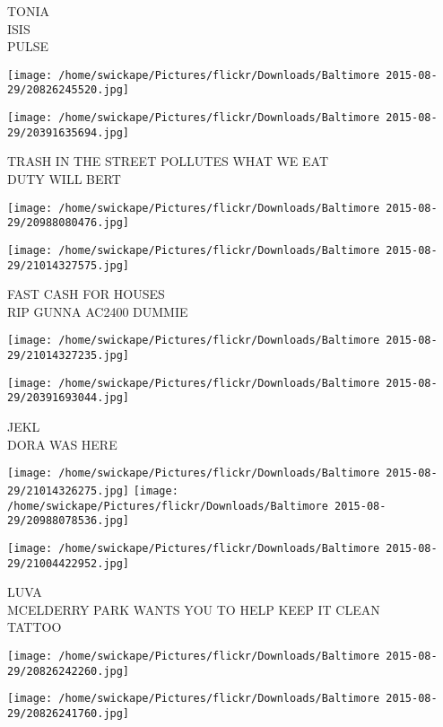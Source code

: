 \documentclass[10pt,letterpaper]{article}
\begin{document}
TONIA\\
ISIS\\
PULSE
\pagebreak

\texttt{[image: /home/swickape/Pictures/flickr/Downloads/Baltimore 2015-08-29/20826245520.jpg]}

\vspace{0.25in}
\texttt{[image: /home/swickape/Pictures/flickr/Downloads/Baltimore 2015-08-29/20391635694.jpg]}

TRASH IN THE STREET POLLUTES WHAT WE EAT\\
DUTY WILL BERT
\pagebreak

\texttt{[image: /home/swickape/Pictures/flickr/Downloads/Baltimore 2015-08-29/20988080476.jpg]}

\vspace{0.25in}
\texttt{[image: /home/swickape/Pictures/flickr/Downloads/Baltimore 2015-08-29/21014327575.jpg]}

FAST CASH FOR HOUSES\\
RIP GUNNA AC2400 DUMMIE
\pagebreak

\texttt{[image: /home/swickape/Pictures/flickr/Downloads/Baltimore 2015-08-29/21014327235.jpg]}

\vspace{0.25in}
\texttt{[image: /home/swickape/Pictures/flickr/Downloads/Baltimore 2015-08-29/20391693044.jpg]}

JEKL\\
DORA WAS HERE
\pagebreak

\texttt{[image: /home/swickape/Pictures/flickr/Downloads/Baltimore 2015-08-29/21014326275.jpg]}
\texttt{[image: /home/swickape/Pictures/flickr/Downloads/Baltimore 2015-08-29/20988078536.jpg]}

\texttt{[image: /home/swickape/Pictures/flickr/Downloads/Baltimore 2015-08-29/21004422952.jpg]}

LUVA\\
MCELDERRY PARK WANTS YOU TO HELP KEEP IT CLEAN\\
TATTOO
\pagebreak

\texttt{[image: /home/swickape/Pictures/flickr/Downloads/Baltimore 2015-08-29/20826242260.jpg]}

\vspace{0.25in}
\texttt{[image: /home/swickape/Pictures/flickr/Downloads/Baltimore 2015-08-29/20826241760.jpg]}
\end{document}

